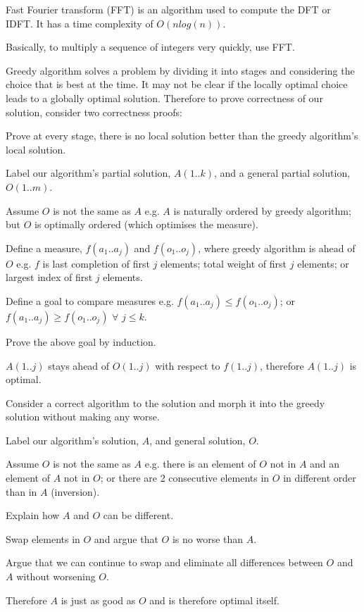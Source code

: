     Fast Fourier transform (FFT) is an algorithm used to compute the DFT or IDFT. It has a time complexity of $O(nlog(n))$.

    Basically, to multiply a sequence of integers very quickly, use FFT.

\subject{Greedy Algorithm}

    Greedy algorithm solves a problem by dividing it into stages and considering the choice that is best at the time. It may not be clear if the locally optimal choice leads to a globally optimal solution. Therefore to prove correctness of our solution, consider two correctness proofs:


        Prove at every stage, there is no local solution better than the greedy algorithm's local solution.

        \startitemize[n]
            \item Label our algorithm's partial solution, $A(1..k)$, and a general partial solution, $O(1..m)$.
            \item Assume $O$ is not the same as $A$ e.g. $A$ is naturally ordered by greedy algorithm; but $O$ is optimally ordered (which optimises the measure).
            \item Define a measure, $f(a_{1}..a_{j})$ and $f(o_{1}..o_{j})$, where greedy algorithm is ahead of $O$ e.g. $f$ is last completion of first $j$ elements; total weight of first $j$ elements; or largest index of first $j$ elements.
            \item Define a goal to compare measures e.g. $f(a_{1}..a_{j}) \leq f(o_{1}..o_{j})$; or $f(a_{1}..a_{j}) \geq f(o_{1}..o_{j})$ $\forall$ $j \leq k$.
            \item Prove the above goal by induction.
            \item $A(1..j)$ stays ahead of $O(1..j)$ with respect to $f(1..j)$, therefore $A(1..j)$ is optimal.
        \stopitemize


        Consider a correct algorithm to the solution and morph it into the greedy solution without making any worse.

        \startitemize[n]
            \item Label our algorithm's solution, $A$, and general solution, $O$.
            \item Assume $O$ is not the same as $A$ e.g. there is an element of $O$ not in $A$ and an element of $A$ not in $O$; or there are 2 consecutive elements in $O$ in different order than in $A$ (inversion).
            \item Explain how $A$ and $O$ can be different.
            \item Swap elements in $O$ and argue that $O$ is no worse than $A$.
            \item Argue that we can continue to swap and eliminate all differences between $O$ and $A$ without worsening $O$.
            \item Therefore $A$ is just as good as $O$ and is therefore optimal itself.
        \stopitemize

